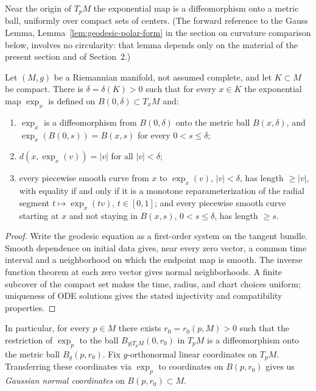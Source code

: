 Near the origin of $T_pM$ the exponential map is a diffeomorphism
onto a metric ball, uniformly over compact sets of centers. (The
forward reference to the Gauss Lemma,
Lemma~\ref{lem:geodesic-polar-form} in the section on curvature
comparison below, involves no circularity: that lemma depends only
on the material of the present section and of
Section~2.)

\begin{lemma}
\label{lem:normal-ball}


Let $(M,g)$ be a Riemannian manifold, not assumed complete, and let
$K\subset M$ be compact. There is $\delta=\delta(K)>0$ such that
for every $x\in K$ the exponential map $\exp_x$ is defined on
$B(0,\delta)\subset T_xM$ and:
\begin{enumerate}
\item $\exp_x$ is a diffeomorphism from $B(0,\delta)$ onto the
metric ball $B(x,\delta)$, and $\exp_x(B(0,s))=B(x,s)$ for every
$0<s\le\delta$;
\item $d(x,\exp_x(v))=|v|$ for all $|v|<\delta$;
\item every piecewise smooth curve from $x$ to $\exp_x(v)$,
$|v|<\delta$, has length $\ge|v|$, with equality if and only if it
is a monotone reparameterization of the radial segment
$t\mapsto\exp_x(tv)$, $t\in[0,1]$; and every piecewise smooth
curve starting at $x$ and not staying in $B(x,s)$, $0<s\le\delta$,
has length $\ge s$.
\end{enumerate}
\end{lemma}

\begin{proof}
\sketch
{}
Write the geodesic equation as a first-order system on the tangent bundle. Smooth dependence on initial data gives, near every zero vector, a common time interval and a neighborhood on which the endpoint map is smooth. The inverse function theorem at each zero vector gives normal neighborhoods. A finite subcover of the compact set makes the time, radius, and chart choices uniform; uniqueness of ODE solutions gives the stated injectivity and compatibility properties.
\end{proof}

In particular, for every $p\in M$ there exists
$r_0=r_{0}(p,M)>0$ such that the restriction of $\exp_p$ to the
ball $B_{g|T_pM}(0,r_0)$ in $T_pM$ is a diffeomorphism onto the
metric ball $B_g(p,r_0)$. Fix $g$-orthonormal linear coordinates
on $T_pM$. Transferring these coordinates via $\exp_p$ to
coordinates on $B(p,r_0)$ gives us {\sl Gaussian normal
coordinates} on $B(p,r_0)\subset M$.

